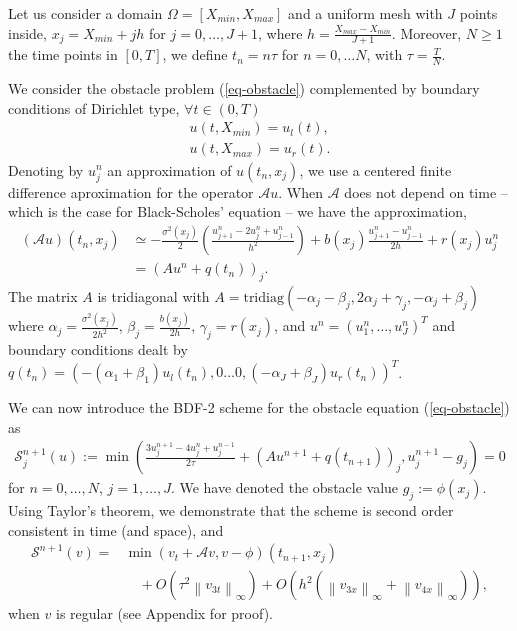 \documentclass[12pt,a4paper]{article}
\newcommand{\ninf}[1]{\left\| {#1} \right\|_\infty}
\begin{document}
Let us consider a domain $\Omega = [X_{min}, X_{max}]$ and a uniform mesh with $J$ points inside, $x_j = X_{min} + jh$ for $j = 0, \dots, J+1$, where $h = \frac{X_{max} - X_{min}}{J+1}$. Moreover, $N \geq 1$ the time points in $[0,T]$, we define $t_n = n \tau$ for $n = 0, \dots N$, with $\tau = \frac{T}{N}$.

We consider the obstacle problem (\ref{eq-obstacle}) complemented by boundary conditions of Dirichlet type, $\forall t \in (0,T)$
\begin{align} 
	u(t, X_{min}) = u_l(t), \label{eq-obstacle_ul}\\
	u(t, X_{max}) = u_r(t). \label{eq-obstacle_ur}
\end{align}
Denoting by $u_j^n$ an approximation of $u(t_n, x_j)$, we use a centered finite difference aproximation for the operator $\mathcal{A} u$. When $\mathcal{A}$ does not depend on time -- which is the case for Black-Scholes' equation -- we have the approximation,
\begin{align*}
	(\mathcal{A} u)(t_n, x_j) &\simeq - \frac{\sigma^2(x_j)}{2} \left( \frac{u_{j+1}^n - 2u_j^n + u_{j-1}^n}{h^2} \right) + b(x_j) \frac{u_{j+1}^n - u_{j-1}^n}{2h} + r(x_j) u_j^n \\
	& = \left( A u^n + q(t_n) \right)_j.
\end{align*}
The matrix $A$ is tridiagonal with $A = \text{tridiag} \left( -\alpha_j-\beta_j, 2\alpha_j + \gamma_j, -\alpha_j+\beta_j \right)$ where $\alpha_j = \frac{\sigma^2(x_j)}{2h^2}$, $\beta_j = \frac{b(x_j)}{2h}$, $\gamma_j = r(x_j)$, and $u^n = (u_1^n, \dots, u_J^n)^T$ and boundary conditions dealt by $q(t_n) = \left( -(\alpha_1+\beta_1) u_l(t_n), 0 \dots 0, (-\alpha_J+\beta_J) u_r(t_n) \right)^T$.

We can now introduce the BDF-2 scheme for the obstacle equation (\ref{eq-obstacle}) as
\begin{align}
	\mathcal{S}_j^{n+1} (u) := \min\left( \frac{3 u_j^{n+1} - 4 u_j^n + u_j^{n-1}}{2 \tau} + (A u^{n+1} + q(t_{n+1}))_j, u_j^{n+1} - g_j \right) = 0 \label{eq-BDF2}
\end{align}
for $n=0,\dots,N$, $j=1,\dots,J$. We have denoted the obstacle value $g_j := \phi(x_j)$. Using Taylor's theorem, we demonstrate that the scheme is second order consistent in time (and space), and
\begin{align*}
	\mathcal{S}^{n+1} (v) = & \min (v_t + \mathcal{A}v, v-\phi)(t_{n+1}, x_j) \\ 
		& \quad + O(\tau^2 \ninf{v_{3t}}) + O(h^2 (\ninf{v_{3x}} + \ninf{v_{4x}})),
\end{align*}
when $v$ is regular (see Appendix for proof). 
\end{document}
